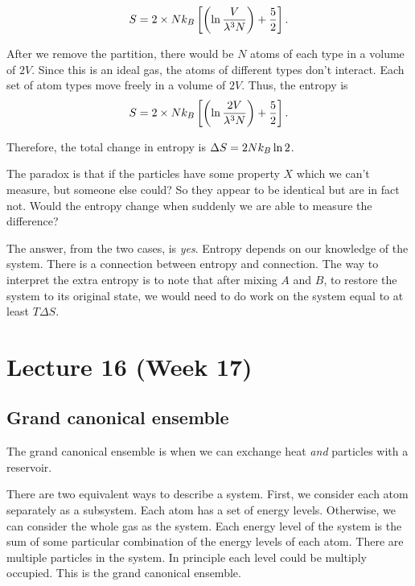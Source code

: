 \documentclass[12pt,chapterprefix=false,dvipsnames]{scrbook}
\theoremstyle{dotless}
\theoremstyle{definition}
\begin{document}
\begin{equation}
	S = 2 \times N k_B \left[
		\left(\naturallogarithm{\frac{V}{\lambda^3 N}}\right) + \frac{5}{2}\right].
\end{equation}

After we remove the partition, there would be
$N$ atoms of each type in a volume of
$2V$. Since this is an ideal gas, the atoms
of different types don't interact. Each set of atom types move
freely in a volume of $2V$. Thus, the entropy
is
\begin{equation}
	S = 2 \times N k_B \left[
		\left(\naturallogarithm{\frac{2V}{\lambda^3 N}}\right) + \frac{5}{2}\right].
\end{equation}

Therefore, the total change in entropy is
$\Delta S = 2 N k_B \naturallogarithm{2}$.

The paradox is that if the particles have some property
$X$ which we can't measure, but someone else
could? So they appear to be identical but are in fact not. Would
the entropy change when suddenly we are able to measure the
difference?

The answer, from the two cases, is \textit{yes}.
Entropy depends on our knowledge of the system. There is a
connection between entropy and connection. The way to interpret
the extra entropy is to note that after mixing
$A$ and $B$, to restore
the system to its original state, we would need to do work on
the system equal to at least $T\Delta S$.

\chapter{Lecture 16 (Week 17)}%
\label{cha:lecture_16}

\section{Grand canonical ensemble}%
\label{sec:grand_canonical_ensemble}

The grand canonical ensemble is when we can exchange heat
\textit{and} particles with a reservoir.

There are two equivalent ways to describe a system. First, we
consider each atom separately as a subsystem. Each atom has a
set of energy levels. Otherwise, we can consider the whole gas
as the system. Each energy level of the system is the sum of
some particular combination of the energy levels of each atom.
There are multiple particles in the system. In principle each
level could be multiply occupied. This is the grand canonical
ensemble.
\end{document}
